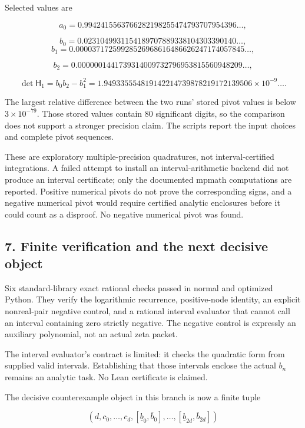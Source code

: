 Selected values are

\[
a_0=0.9942415563766282198255474793707954396\ldots,
\]

\[
b_0=0.0231049931154189707889338104303390140\ldots,
\]
\[
b_1=0.00003717259928526968616486626247174057845\ldots,
\]

\[
b_2=0.0000001441739314009732796953815560948209\ldots,
\]

\[
\det\mathsf H_1
=b_0b_2-b_1^2
=1.949335554819142214739878219172139506\times10^{-9}\ldots.
\]

The largest relative difference between the two runs' stored pivot
values is below \(3\times10^{-79}\). Those stored values contain 80
significant digits, so the comparison does not support a stronger
precision claim. The scripts report the input choices and complete pivot
sequences.

These are exploratory multiple-precision quadratures, not
interval-certified integrations. A failed attempt to install an
interval-arithmetic backend did not produce an interval certificate;
only the documented mpmath computations are reported. Positive numerical
pivots do not prove the corresponding signs, and a negative numerical
pivot would require certified analytic enclosures before it could count
as a disproof. No negative numerical pivot was found.

\subsection{7. Finite verification and the next decisive
object}\label{C47stage:WB:finite-verification-and-the-next-decisive-object}

Six standard-library exact rational checks passed in normal and
optimized Python. They verify the logarithmic recurrence, positive-node
identity, an explicit nonreal-pair negative control, and a rational
interval evaluator that cannot call an interval containing zero strictly
negative. The negative control is expressly an auxiliary polynomial, not
an actual zeta packet.

The interval evaluator's contract is limited: it checks the quadratic
form from supplied valid intervals. Establishing that those intervals
enclose the actual \(b_n\) remains an analytic task. No Lean certificate
is claimed.

The decisive counterexample object in this branch is now a finite tuple

\[
(d,c_0,\ldots,c_d,
[\underline b_0,\overline b_0],\ldots,
[\underline b_{2d},\overline b_{2d}])
\]


